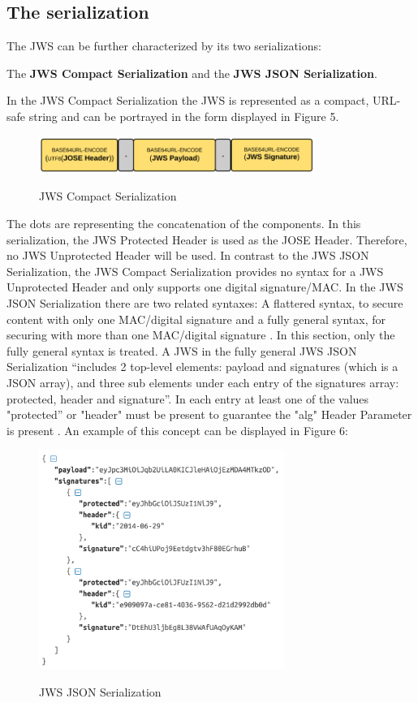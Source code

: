 \subsection{The serialization}
The JWS can be further characterized by its two serializations:\begin{center} The \textbf{JWS Compact Serialization} and the \textbf{JWS JSON Serialization}.\end{center}
In the JWS Compact Serialization the JWS is represented as a compact, URL-safe string \cite{rfc7515} and can be portrayed in the form displayed in Figure 5.
\begin{figure}
\centering
\includegraphics[width=9cm]{Pages/JWS/CompactSerialization.png}
\caption{JWS Compact Serialization}\cite{Compact}
\end{figure}
The dots are representing the concatenation of the components.
In this serialization, the JWS Protected Header is used as the JOSE Header. Therefore, no JWS Unprotected Header will be used.\newline
In contrast to the JWS JSON Serialization, the JWS Compact Serialization provides no syntax for a JWS Unprotected Header and only supports one digital signature/MAC.
In the JWS JSON Serialization there are two related syntaxes: A flattered syntax, to secure content with only one MAC/digital signature and a fully general syntax, for securing with more than one MAC/digital signature \cite{rfc7515}. In this section, only the fully general syntax is treated. 
A JWS in the fully general JWS JSON Serialization ``includes 2 top-level elements: payload and signatures (which is a JSON array), and three sub elements under each entry of the signatures array: protected, header and signature''\cite{Dummies}.
In each entry at least one of the values "protected'' or "header" must be present to guarantee the "alg" Header Parameter is present \cite{rfc7515}.\newline
An example of this concept can be displayed in Figure 6:\newline 
	\begin{figure}
\centering
\includegraphics[width=8cm]{Pages/JWS/JSONSerialization.png}
\caption{JWS JSON Serialization} \cite{JSON}
\end{figure}
